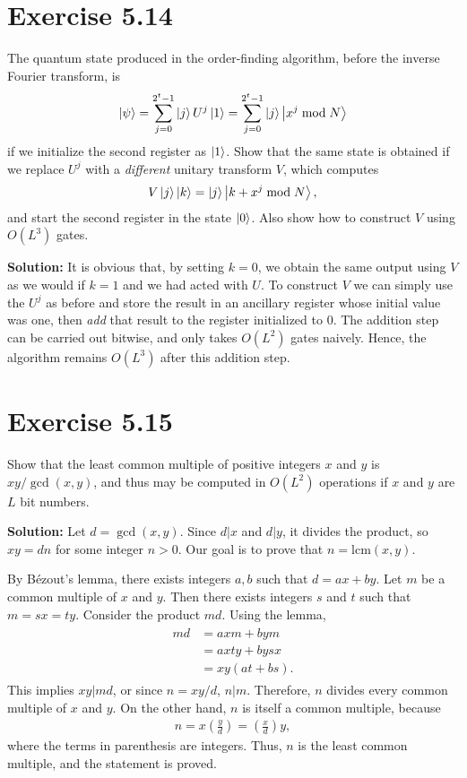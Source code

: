 \documentclass{book}
\begin{document}
\section*{Exercise 5.14}
    The quantum state produced in the order-finding algorithm, before
    the inverse Fourier transform, is
    \begin{align}
        \ket{\psi} =\sum_{j=0}^{2^t-1}\ket{j}U^j\ket{1} =\sum_{j=0}^{2^t-1}\ket{j}\ket{x^j\bmod N}
    \end{align}
    if we initialize the second register as $\ket{1}$. Show that the same state is obtained if we replace $U^j$ with a \emph{different} unitary transform $V$, which computes
    \begin{align}
        V\ket{j}\ket{k} = \ket{j}\ket{k+x^j\bmod N},
    \end{align}
    and start the second register in the state $\ket{0}$. Also show how to construct $V$ using $O(L^3)$ gates.

    \textbf{Solution:} It is obvious that, by setting $k=0$, we obtain the same output using $V$ as we would if $k=1$ and we had acted with $U$. To construct $V$ we can simply use the $U^j$ as before and store the result in an ancillary register whose initial value was one, then \emph{add} that result to the register initialized to 0. The addition step can be carried out bitwise, and only takes $O(L^2)$ gates naively. Hence, the algorithm remains $O(L^3)$ after this addition step.

\section*{Exercise 5.15}
    Show that the least common multiple of positive integers $x$ and $y$ is $xy/\gcd(x,y)$, and thus may be computed in $O(L^2)$ operations if $x$ and $y$ are $L$ bit numbers.
    
    \textbf{Solution:} Let $d = \gcd(x,y)$. Since $d|x$ and $d|y$, it divides the product, so $xy = dn$ for some integer $n >0$. Our goal is to prove that $n=\text{lcm}(x,y)$.
    
    By Bézout's lemma, there exists integers $a,b$ such that $d = ax + by$. Let $m$ be a common multiple of $x$ and $y$. Then there exists integers $s$ and $t$ such that $m=sx=ty$. Consider the product $md$. Using the lemma,
    \begin{align}
    \begin{aligned}
        md &= axm+bym \\
        &= axty + bysx \\
        &= xy(at+bs).
    \end{aligned}
    \end{align}
    This implies $xy|md$, or since $n = xy/d$, $n|m$. Therefore, $n$ divides every common multiple of $x$ and $y$. On the other hand, $n$ is itself a common multiple, because 
    \begin{align}
        n = x \left(\frac{y}{d}\right) = \left(\frac{x}{d}\right)y,
    \end{align}
    where the terms in parenthesis are integers. Thus, $n$ is the least common multiple, and the statement is proved.
    
\end{document}
